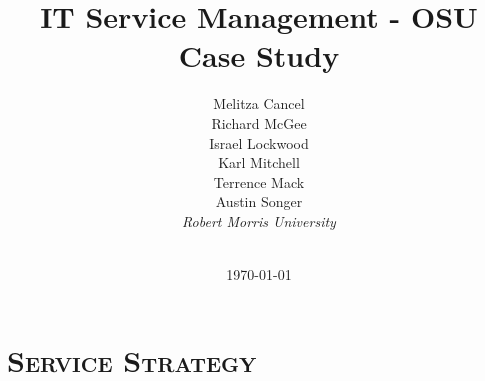 \documentclass[xcolor=x11names,compress]{beamer}
\renewcommand{\(}{\begin{columns}}
\renewcommand{\)}{\end{columns}}
\newcommand{\<}[1]{\begin{column}{#1}}
\renewcommand{\>}{\end{column}}
\begin{document}
\section{\scshape }
\begin{frame}
\title{IT Service Management - OSU Case Study}
\author{
	Melitza Cancel\\
	Richard McGee\\
	Israel Lockwood\\
	Karl Mitchell\\
	Terrence Mack\\
	Austin Songer\\
	{\it Robert Morris University}\\
}
\date{
	\\
	\vspace{1cm}
	\today }
\titlepage
\end{frame}
\begin{frame}{}


\end{frame}
\section{\scshape Service Strategy}
\end{document}
